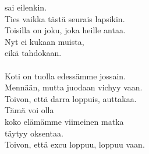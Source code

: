 sai eilenkin. \\ Ties vaikka tästä seurais lapsikin. \\ Toisilla on joku, joka heille antaa. \\ Nyt ei kukaan muista, \\ eikä tahdokaan. \\ \hspace{10mm} \\ Koti on tuolla edessämme jossain. \\ Mennään, mutta juodaan vichyy vaan. \\ Toivon, että darra loppuis, auttakaa. \\ Tämä voi olla \\ koko elämämme viimeinen matka \\ täytyy oksentaa. \\ Toivon, että excu loppuu, loppuu vaan.